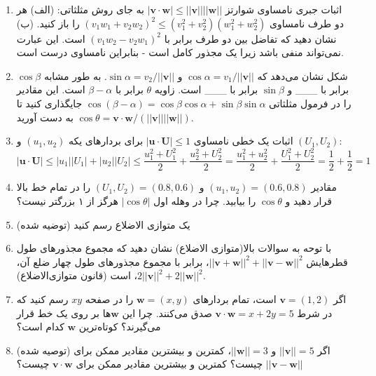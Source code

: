 \documentclass[12pt, a4paper]{book}
\begin{document}
\begin{enumerate}
		\item اثبات جبری نامساوی شوارتز $|\mathbf{v}\cdot\mathbf{w}| \le ||\mathbf{v}||||\mathbf{w}||$ به جای روش مثلثاتی:
		(الف) هر دو طرف نامساوی $(v_1w_1+v_2w_2)^2 \le (v_1^2+v_2^2)(w_1^2+w_2^2)$ را باز کنید.
		(ب) نشان دهید که تفاضل بین دو طرف برابر با $(v_1w_2 - v_2w_1)^2$ است. این عبارت نمی‌تواند منفی باشد زیرا یک مجذور کامل است - بنابراین نامساوی درست است.
		\item شکل نشان می‌دهد که $\cos\alpha = v_1/||\mathbf{v}||$ و $\sin\alpha = v_2/||\mathbf{v}||$. به طور مشابه $\cos\beta$ برابر با \_\_\_ و $\sin\beta$ برابر با \_\_\_ است. زاویه $\theta$ برابر با $\beta-\alpha$ است. این مقادیر را در فرمول مثلثاتی $\cos(\beta-\alpha)=\cos\beta\cos\alpha+\sin\beta\sin\alpha$ جایگذاری کنید تا به دست آورید $\cos\theta = \mathbf{v}\cdot\mathbf{w} / (||\mathbf{v}||||\mathbf{w}||)$.
		\item اثبات یک خطی نامساوی $|\mathbf{u}\cdot\mathbf{U}| \le 1$ برای بردارهای یکه $(u_1, u_2)$ و $(U_1, U_2)$:
		\[ |\mathbf{u}\cdot\mathbf{U}| \le |u_1||U_1| + |u_2||U_2| \le \frac{u_1^2+U_1^2}{2} + \frac{u_2^2+U_2^2}{2} = \frac{u_1^2+u_2^2}{2} + \frac{U_1^2+U_2^2}{2} = \frac{1}{2}+\frac{1}{2}=1 \]
		\item مقادیر $(u_1,u_2) = (0.6, 0.8)$ و $(U_1, U_2) = (0.8, 0.6)$ را در تمام خط بالا قرار دهید و $\cos\theta$ را بیابید. چرا در وهله اول $|\cos\theta|$ هرگز از ۱ بزرگتر نیست؟
		\item  (توضیه شده) یک متوازی الاضلاع رسم کنید
		
		\item  با توحه به سوالات بالا(متوازی الاضلاع)  نشان دهید که مجموع مجذورهای طول قطرهایش $||\mathbf{v}+\mathbf{w}||^2 + ||\mathbf{v}-\mathbf{w}||^2$، برابر با مجموع مجذورهای طول چهار ضلع آن، $2||\mathbf{v}||^2+2||\mathbf{w}||^2$، است (قانون متوازی‌الاضلاع).
		
	
		\item اگر $\mathbf{v}=(1,2)$ است، تمام بردارهای $\mathbf{w}=(x,y)$ را در صفحه $xy$ رسم کنید که در شرط $\mathbf{v}\cdot\mathbf{w}=x+2y=5$ صدق می‌کنند. چرا این $\mathbf{w}$ها بر روی یک خط قرار می‌گیرند؟ کوتاه‌ترین $\mathbf{w}$ کدام است؟
		\item (توصیه شده) اگر $||\mathbf{v}||=5$ و $||\mathbf{w}||=3$، کمترین و بیشترین مقادیر ممکن برای $||\mathbf{v}-\mathbf{w}||$ چیست؟ کمترین و بیشترین مقادیر ممکن برای $\mathbf{v}\cdot\mathbf{w}$ چیست؟
		

\end{enumerate}
\end{document}
